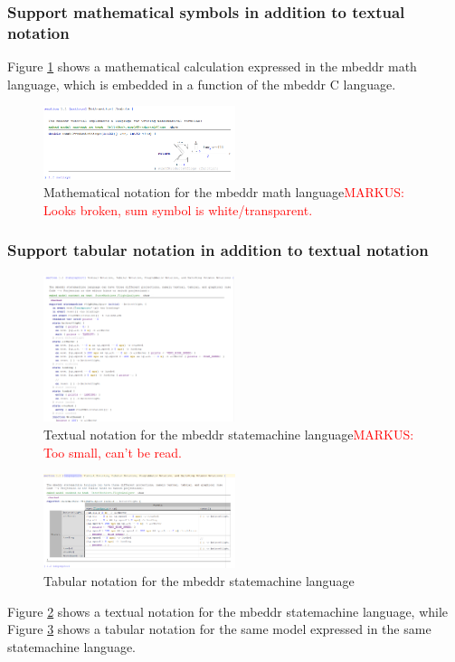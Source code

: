 \documentclass[preprint,numbers,10pt]{sigplanconf}
\newcommand\markus[1]{\textcolor{red}{MARKUS: {#1}}}
\begin{document}
\subsubsection{Support mathematical symbols in addition to textual notation}
Figure \ref{fig:mathnotation} shows a mathematical calculation expressed in the mbeddr math language, which is embedded in a function of the mbeddr C language.
\begin{figure}[H]
	\centering
	\includegraphics[width=0.50\textwidth]{screens/MathematicalNotation.png}
	\caption{Mathematical notation for the mbeddr math language\markus{Looks
	broken, sum symbol is white/transparent.}}
	\label{fig:mathnotation}
\end{figure}

\subsubsection{Support tabular notation in addition to textual notation}\label{sec:tabnot}
\begin{figure}[H]
	\centering
	\includegraphics[width=0.50\textwidth]{screens/TextualNotationStatemachine.png}
	\caption{Textual notation for the mbeddr statemachine language\markus{Too
	small, can't be read.}}
	\label{fig:txtnotationsm}
\end{figure}
\begin{figure}[H]
	\centering
	\includegraphics[width=0.50\textwidth]{screens/TabularNotationStatemachines.png}
	\caption{Tabular notation for the mbeddr statemachine language}
	\label{fig:tabnotationsm}
\end{figure}
Figure \ref{fig:txtnotationsm} shows a textual notation for the mbeddr statemachine language, while Figure \ref{fig:tabnotationsm} shows a tabular notation for the same model expressed in the same statemachine language.
\end{document}
